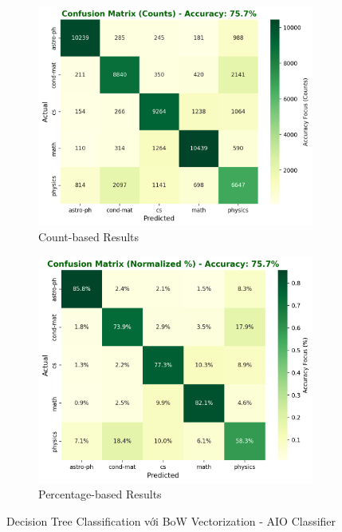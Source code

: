 \begin{figure}[H]
\centering
\begin{subfigure}{0.48\textwidth}
    \centering
    \includegraphics[width=\textwidth]{image/DT_bow_count.png}
    \caption{Count-based Results}
    \label{fig:dt_bow_count_improvements}
\end{subfigure}
\hfill
\begin{subfigure}{0.48\textwidth}
    \centering
    \includegraphics[width=\textwidth]{image/DT_bow_percent.png}
    \caption{Percentage-based Results}
    \label{fig:dt_bow_percent_improvements}
\end{subfigure}
\caption{Decision Tree Classification với BoW Vectorization - AIO Classifier}
\label{fig:dt_bow_results_improvements}
\end{figure}


